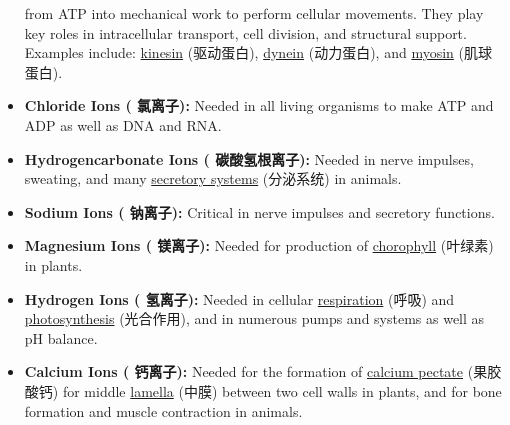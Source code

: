 \begin{itemize}
{    from ATP into mechanical work to perform cellular movements. They play key roles in intracellular transport, cell division,
    and structural support. Examples include: \underline{kinesin} (驱动蛋白), \underline{dynein} (动力蛋白), and \underline{myosin}
    (肌球蛋白).}
    \item\textbf{Chloride Ions ( 氯离子):} Needed in all living organisms to make ATP and ADP as well as DNA and RNA.
    \item \textbf{Hydrogencarbonate Ions ( 碳酸氢根离子):} Needed in nerve impulses, sweating, and many
    \underline{secretory systems} (分泌系统) in animals.
    \item \textbf{Sodium Ions ( 钠离子):} Critical in nerve impulses and secretory functions.
    \item \textbf{Magnesium Ions ( 镁离子):} Needed for production of \underline{chorophyll} (叶绿素) in plants.
    \item \textbf{Hydrogen Ions ( 氢离子):} Needed in cellular \underline{respiration} (呼吸) and \underline{photosynthesis}
    (光合作用), and in numerous pumps and systems as well as pH balance.
    \item \textbf{Calcium Ions ( 钙离子):} Needed for the formation of \underline{calcium pectate} (果胶酸钙) for middle
    \underline{lamella} (中膜) between two cell walls in plants, and for bone formation and muscle contraction in animals.
\end{itemize}
